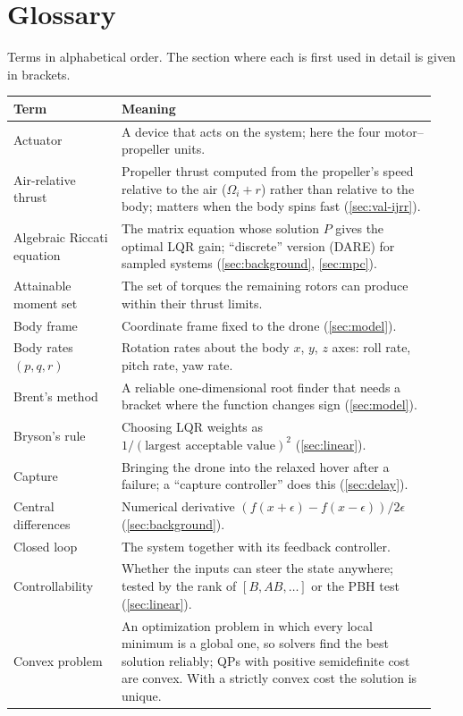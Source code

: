 \section{Glossary}\label{app:glossary}
Terms in alphabetical order. The section where each is first used in detail is given in brackets.

\small
\begin{longtable}{p{0.24\linewidth}p{0.70\linewidth}}
\toprule
Term & Meaning \\
\midrule
\endhead
Actuator & A device that acts on the system; here the four motor--propeller units. \\
Air-relative thrust & Propeller thrust computed from the propeller's speed relative to the air ($\Omega_i + r$) rather than relative to the body; matters when the body spins fast (\ref{sec:val-ijrr}). \\
Algebraic Riccati equation & The matrix equation whose solution $P$ gives the optimal LQR gain; ``discrete'' version (DARE) for sampled systems (\ref{sec:background}, \ref{sec:mpc}). \\
Attainable moment set & The set of torques the remaining rotors can produce within their thrust limits. \\
Body frame & Coordinate frame fixed to the drone (\ref{sec:model}). \\
Body rates $(p,q,r)$ & Rotation rates about the body $x$, $y$, $z$ axes: roll rate, pitch rate, yaw rate. \\
Brent's method & A reliable one-dimensional root finder that needs a bracket where the function changes sign (\ref{sec:model}). \\
Bryson's rule & Choosing LQR weights as $1/(\text{largest acceptable value})^2$ (\ref{sec:linear}). \\
Capture & Bringing the drone into the relaxed hover after a failure; a ``capture controller'' does this (\ref{sec:delay}). \\
Central differences & Numerical derivative $(f(x+\epsilon) - f(x-\epsilon))/2\epsilon$ (\ref{sec:background}). \\
Closed loop & The system together with its feedback controller. \\
Controllability & Whether the inputs can steer the state anywhere; tested by the rank of $[B, AB, \dots]$ or the PBH test (\ref{sec:linear}). \\
Convex problem & An optimization problem in which every local minimum is a global one, so solvers find the best solution reliably; QPs with positive semidefinite cost are convex. With a strictly convex cost the solution is unique. \\

\end{longtable}
